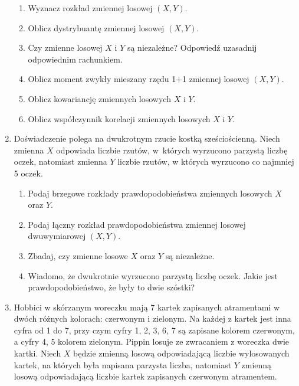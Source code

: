 \documentclass{mwart}
\newcommand{\ans}[1]{}
\newcommand{\ans}[1]{\emph{Odpowiedź:} #1}
\begin{document}
\begin{enumerate}
\begin{enumerate}
\item Wyznacz rozkład zmiennej losowej $(X,Y)$. \ans{$P(0,0)=\frac{39}{52} P(1,0)=0 P(0,1)=\frac{12}{52} P(1,1)=\frac{1}{52}$}
\item Oblicz dystrybuantę zmiennej losowej $(X,Y)$.
\item Czy zmienne losowej $X$ i $Y$ są niezależne? Odpowiedź uzasadnij odpowiednim rachunkiem. \ans{Nie, $0=P(1,0)\neq P(X=1)P(Y=0)=\frac{39}{52^2}$}
\item Oblicz moment zwykły mieszany rzędu 1+1 zmiennej losowej $(X,Y)$. \ans{$EXY=\frac{1}{52}$}
\item Oblicz kowariancję zmiennych losowych $X$ i $Y$.
\item Oblicz współczynnik korelacji zmiennych losowych $X$ i $Y$.
\end{enumerate}
\item Doświadczenie polega na dwukrotnym rzucie kostką sześciościenną. Niech zmienna $X$ odpowiada liczbie rzutów, w~których wyrzucono parzystą liczbę oczek, natomiast zmienna $Y$ liczbie rzutów, w których wyrzucono co najmniej 5 oczek.
\begin{enumerate}
\item Podaj brzegowe rozkłady prawdopodobieństwa zmiennych losowych $X$ oraz $Y$.
\item Podaj łączny rozkład prawdopodobieństwa zmiennej losowej dwuwymiarowej $(X,Y)$.
\item Zbadaj, czy zmienne losowe $X$ oraz $Y$ są niezależne.
\item Wiadomo, że dwukrotnie wyrzucono parzystą liczbę oczek. Jakie jest prawdopodobieństwo, że były to dwie szóstki? 
\end{enumerate}

\item Hobbici w skórzanym woreczku mają 7 kartek zapisanych atramentami w dwóch różnych kolorach: czerwonym i zielonym.
Na każdej z kartek jest inna cyfra od 1 do 7, przy czym cyfry 1, 2, 3, 6, 7 są zapisane kolorem czerwonym, a cyfry 4, 5 kolorem zielonym.
Pippin losuje ze zwracaniem z woreczka dwie kartki.
Niech $X$ będzie zmienną losową odpowiadającą liczbie wylosowanych kartek, na których była napisana parzysta liczba, natomiast $Y$ zmienną losową odpowiadającą liczbie kartek zapisanych czerwonym atramentem.


\end{enumerate}
\end{document}
